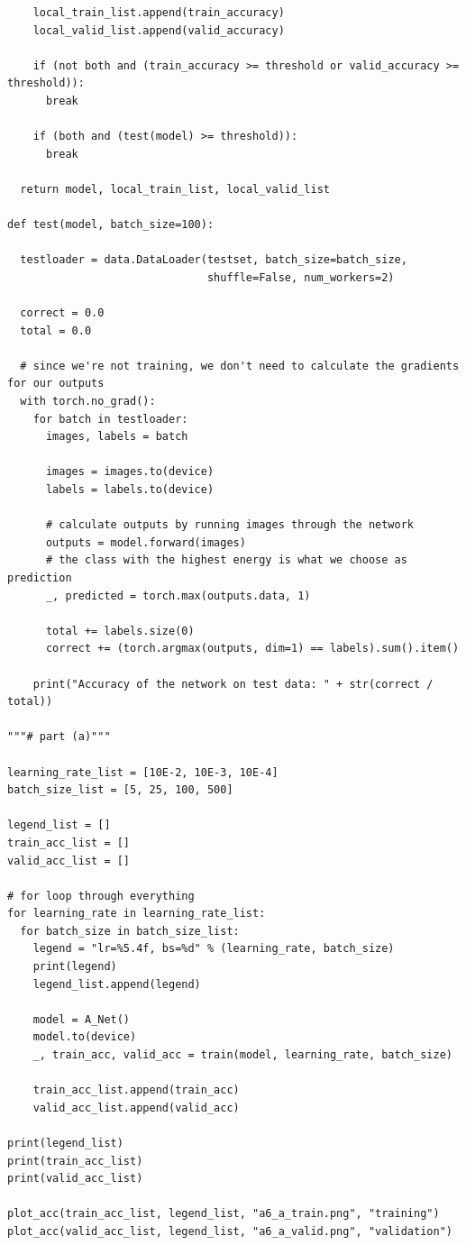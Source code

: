 \documentclass{article}
\newcommand{\1}{\mathbf{1}}
\begin{document}
{\begin{verbatim}
    local_train_list.append(train_accuracy)
    local_valid_list.append(valid_accuracy)
    
    if (not both and (train_accuracy >= threshold or valid_accuracy >= threshold)):
      break
    
    if (both and (test(model) >= threshold)):
      break

  return model, local_train_list, local_valid_list

def test(model, batch_size=100):

  testloader = data.DataLoader(testset, batch_size=batch_size,
                               shuffle=False, num_workers=2)

  correct = 0.0
  total = 0.0

  # since we're not training, we don't need to calculate the gradients for our outputs
  with torch.no_grad():
    for batch in testloader:
      images, labels = batch

      images = images.to(device)
      labels = labels.to(device)

      # calculate outputs by running images through the network 
      outputs = model.forward(images)
      # the class with the highest energy is what we choose as prediction
      _, predicted = torch.max(outputs.data, 1)

      total += labels.size(0)
      correct += (torch.argmax(outputs, dim=1) == labels).sum().item()

    print("Accuracy of the network on test data: " + str(correct / total))

"""# part (a)"""

learning_rate_list = [10E-2, 10E-3, 10E-4]
batch_size_list = [5, 25, 100, 500]

legend_list = []
train_acc_list = []
valid_acc_list = []

# for loop through everything 
for learning_rate in learning_rate_list:
  for batch_size in batch_size_list:
    legend = "lr=%5.4f, bs=%d" % (learning_rate, batch_size)
    print(legend)
    legend_list.append(legend)

    model = A_Net()
    model.to(device)
    _, train_acc, valid_acc = train(model, learning_rate, batch_size)

    train_acc_list.append(train_acc)
    valid_acc_list.append(valid_acc)

print(legend_list)
print(train_acc_list)
print(valid_acc_list)

plot_acc(train_acc_list, legend_list, "a6_a_train.png", "training")
plot_acc(valid_acc_list, legend_list, "a6_a_valid.png", "validation")


\end{verbatim}}
\end{document}
